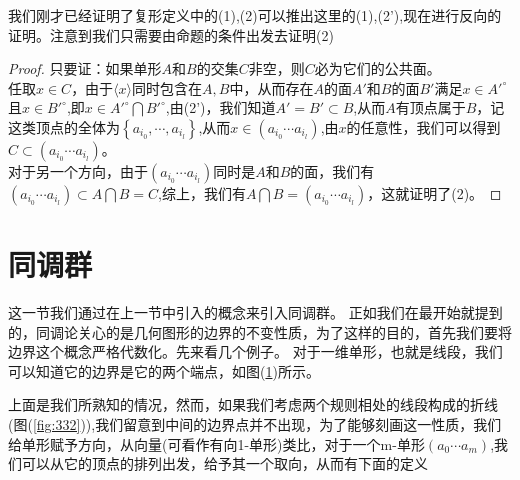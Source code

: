 我们刚才已经证明了复形定义中的(1),(2)可以推出这里的(1),(2'),现在进行反向的证明。注意到我们只需要由命题的条件出发去证明(2)
\begin{proof}
只要证：如果单形$A$和$B$的交集$C$非空，则$C$必为它们的公共面。\\
任取$x\in C$，由于$\langle x\rangle$同时包含在$A,B$中，从而存在$A$的面$A'$和$B$的面$B'$满足$x\in A'^{\circ}$且$x\in B'^{\circ}$,即$x\in A'^{\circ}\bigcap B'^{\circ}$,由(2')，我们知道$A'=B'\subset B$,从而$A$有顶点属于$B$，记这类顶点的全体为$\left\{a_{i_{0}},\cdots,a_{i_{l}}\right\}$,从而$x\in (a_{i_{0}}\cdots a_{i_{l}})$,由$x$的任意性，我们可以得到$C\subset (a_{i_{0}}\cdots a_{i_{l}})$。\\
对于另一个方向，由于$(a_{i_{0}}\cdots a_{i_{l}})$同时是$A$和$B$的面，我们有$(a_{i_{0}}\cdots a_{i_{l}}) \subset A\bigcap B=C$,综上，我们有$A\bigcap B=(a_{i_{0}}\cdots a_{i_{l}})$，这就证明了(2)。
\end{proof}
\section{同调群}
这一节我们通过在上一节中引入的概念来引入同调群。
正如我们在最开始就提到的，同调论关心的是几何图形的边界的不变性质，为了这样的目的，首先我们要将边界这个概念严格代数化。先来看几个例子。
对于一维单形，也就是线段，我们可以知道它的边界是它的两个端点，如图(\ref{fig:293})所示。
\begin{figure}[htbp]
\centering
{}
    \caption{}
    \label{fig:293}
\end{figure}
上面是我们所熟知的情况，然而，如果我们考虑两个规则相处的线段构成的折线(图(\ref{fig:332})),我们留意到中间的边界点并不出现，为了能够刻画这一性质，我们给单形赋予方向，从向量(可看作有向1-单形)类比，对于一个m-单形$(a_{0}\cdots a_{m})$,我们可以从它的顶点的排列出发，给予其一个取向，从而有下面的定义

